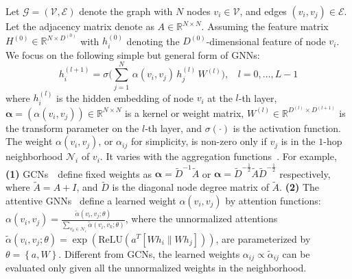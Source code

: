 \documentclass{article}
\begin{document}
Let $\mathcal{G} = (\mathcal{V}, \mathcal{E})$ denote the graph with 
$N$ nodes $v_i \in \mathcal{V}$, and edges 
$(v_i, v_j) \in \mathcal{E}$. Let the adjacency matrix 
denote as $A \in \mathbb{R}^{N \times N}$. 
Assuming the feature matrix $H^{(0)} \in \mathbb{R}^{N\times D^{(0)}}$ 
with $h_i^{(0)}$ denoting the $D^{(0)}$-dimensional feature 
of node $v_i$. We focus on the following simple 
but general form of GNNs:
\begin{equation}\label{eq:gnn}
h_i^{(l+1)} = \sigma\Big(\sum_{j=1}^N\,\alpha(v_i, v_j)\,h_j^{(l)}\,W^{(l)}\Big),~~~~l = 0,\ldots, L-1
\end{equation}
where $h_i^{(l)}$ is the hidden embedding of node $v_i$ at the $l$-th layer,
$\pmb{\alpha} = \left(\alpha(v_i, v_j)\right) \in \mathbb{R}^{N \times N}$ is a kernel or weight matrix,  
$W^{(l)} \in \mathbb{R}^{D^{(l)} \times D^{(l+1)}}$ is the 
transform parameter on the $l$-th layer, and $\sigma(\cdot)$ 
is the activation function. The weight 
$\alpha(v_i, v_j)$, or $\alpha_{ij}$ for simplicity, 
is non-zero only if $v_j$ is in the $1$-hop 
neighborhood $\mathcal{N}_i$ of $v_i$. It varies with 
the aggregation 
functions~\cite{battaglia2018relational,wu2019comprehensive}. 
For example, 
\textbf{(1)} GCNs~\cite{dai2016discriminative,kipf2016semi}~define fixed weights as $\pmb{\alpha} = \tilde{D}^{-1} \tilde{A}$ or $\pmb{\alpha} = \tilde{D}^{-\frac{1}{2}} \tilde{A} \tilde{D}^{-\frac{1}{2}}$ respectively, where $\tilde{A} = A + I$, and $\tilde{D}$ is the diagonal node degree matrix of $\tilde{A}$.
    \textbf{(2)} The attentive GNNs~\cite{velivckovic2017graph,liu2019geniepath} define a learned weight $\alpha(v_i, v_j)$ by attention functions:
$\alpha(v_i, v_j) = \frac{\tilde{\alpha}(v_i, v_j;\theta)}{\sum_{v_k \in \mathcal{N}_i} \tilde{\alpha}(v_i, v_k;\theta)}$, where the unnormalized
attentions
    $\tilde{\alpha}(v_i, v_j; \theta) = \exp(\mathrm{ReLU}(a^{T}[Wh_i\| Wh_j]))$,
are parameterized by $\theta = \left\{a, W\right\}$. Different from GCNs, the learned weights $\alpha_{ij} \propto \tilde{\alpha}_{ij}$ can be evaluated only given all the unnormalized weights in the neighborhood.
\end{document}
